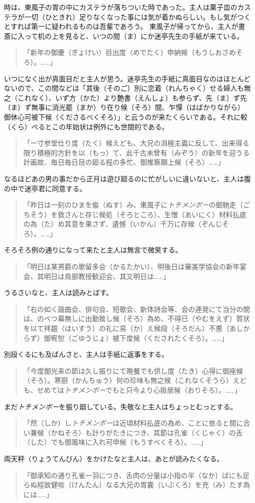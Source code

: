 \documentclass{book}
\begin{document}
時は、東風子の胃の中にカステラが落ちついた時であった。主人は菓子皿のカステラが一切（ひときれ）足りなくなった事には気が着かぬらしい。もし気がつくとすれば第一に疑われるものは吾輩であろう。
東風子が帰ってから、主人が書斎に入って机の上を見ると、いつの間（ま）にか迷亭先生の手紙が来ている。
\blockquote{「新年の御慶（ぎょけい）目出度（めでたく）申納候（もうしおさめそろ）。\ldots{}\ldots{}」}
いつになく出が真面目だと主人が思う。迷亭先生の手紙に真面目なのはほとんどないので、この間などは「其後（そのご）別に恋着（れんちゃく）せる婦人も無之（これなく）、いず方（かた）より艶書（えんしょ）も参らず、先（ま）ず先（ま）ず無事に消光罷（まか）り在り候（そろ）間、乍憚（はばかりながら）御休心可被下候（くださるべくそろ）」と云うのが来たくらいである。それに較（くら）べるとこの年始状は例外にも世間的である。
\blockquote{「一寸参堂仕り度（たく）候えども、大兄の消極主義に反して、出来得る限り積極的方針を以（もっ）て、此千古未曾有（みぞう）の新年を迎うる計画故、毎日毎日目の廻る程の多忙、御推察願上候（そろ）\ldots{}\ldots{}」}
なるほどあの男の事だから正月は遊び廻るのに忙がしいに違いないと、主人は腹の中で迷亭君に同意する。
\blockquote{「昨日は一刻のひまを偸（ぬす）み、東風子に\emph{トチメンボー}の御馳走（ごちそう）を致さんと存じ候処（そろところ）、生憎（あいにく）材料払底の為（た）め其意を果さず、遺憾（いかん）千万に存候（ぞんじそろ）。\ldots{}\ldots{}」}
そろそろ例の通りになって来たと主人は無言で微笑する。
\blockquote{「明日は某男爵の歌留多会（かるたかい）、明後日は審美学協会の新年宴会、其明日は鳥部教授歓迎会、其又明日は\ldots{}\ldots{}」}
うるさいなと、主人は読みとばす。
\blockquote{「右の如く謡曲会、俳句会、短歌会、新体詩会等、会の連発にて当分の間は、のべつ幕無しに出勤致し候（そろ）為め、不得已（やむをえず）賀状を以て拝趨（はいすう）の礼に易（か）え候段（そろだん）不悪（あしからず）御宥恕（ごゆうじょ）被下度候（くだされたくそろ）。\ldots{}\ldots{}」}
別段くるにも及ばんさと、主人は手紙に返事をする。
\blockquote{「今度御光来の節は久し振りにて晩餐でも供し度（たき）心得に御座候（そろ）。寒厨（かんちゅう）何の珍味も無之候（これなくそうら）えども、せめては\emph{トチメンボー}でもと只今より心掛居候（おりそろ）。\ldots{}\ldots{}」}
まだ\emph{トチメンボー}を振り廻している。失敬なと主人はちょっとむっとする。
\blockquote{「然（しか）し\emph{トチメンボー}は近頃材料払底の為め、ことに依ると間に合い兼候（かねそろ）も計りがたきにつき、其節は孔雀（くじゃく）の舌（した）でも御風味に入れ可申候（もうすべくそろ）。\ldots{}\ldots{}」}
両天秤（りょうてんびん）をかけたなと主人は、あとが読みたくなる。
\blockquote{「御承知の通り孔雀一羽につき、舌肉の分量は小指の半（なか）ばにも足らぬ程故健啖（けんたん）なる大兄の胃嚢（いぶくろ）を充（み）たす為には\ldots{}\ldots{}」}
\end{document}
